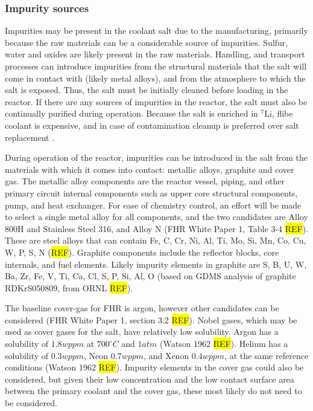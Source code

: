 \documentclass[11pt]{article}
\newcommand{\iso}[2]{$^{#2}\mathrm{#1}$}
\newcommand{\REF}[0]{\colorbox{yellow}{REF}}
\begin{document}
\subsubsection{Impurity sources}

Impurities may be present in the coolant salt due to the manufacturing, primarily because the raw materials can be a considerable source of impurities.
Sulfur, water and oxides are likely present in the raw materials.
Handling, and transport processes can introduce impurities from the structural materials that the salt will come in contact with (likely metal alloys), and from the atmosphere to which the salt is exposed.
Thus, the salt must be initially cleaned before loading in the reactor.
If there are any sources of impurities in the reactor, the salt must also be continually purified during operation.
Because the salt is enriched in \iso{Li}{7}, flibe coolant is expensive, and in case of contamination cleanup is preferred over salt replacement \cite{shaffer1971phs}.

During operation of the reactor, impurities can be introduced in the salt from the materials with which it comes into contact: metallic alloys, graphite and cover gas.
The metallic alloy components are the reactor vessel, piping, and other primary circuit internal components such as upper core structural components, pump, and heat exchanger.
For ease of chemistry control, an effort will be made to select a single metal alloy for all components, and the two candidates are Alloy 800H and Stainless Steel 316, and Alloy N (FHR White Paper 1, Table 3-4 \REF).
These are steel alloys that can contain Fe, C, Cr, Ni, Al, Ti, Mo, Si, Mn, Co, Cu, W, P, S, N (\REF).
Graphite components include the reflector blocks, core internals, and fuel elements.
Likely impurity elements in graphite are S, B, U, W, Ba, Zr, Fe, V, Ti, Ca, Cl, S, P, Si, Al, O (based on GDMS analysis of graphite RDKrS050809, from ORNL \REF).

The baseline cover-gas for FHR is argon, however other candidates can be considered (FHR White Paper 1, section 3.2 \REF).
Nobel gases, which may be used as cover gases for the salt, have relatively low solubility.
Argon has a solubility of $1.8wppm$ at $700^\circ C$ and $1atm$ (Watson 1962 \REF).
Helium has a solubility of $0.3wppm$, Neon $0.7wppm$, and Xenon $0.4wppm$, at the same reference conditions (Watson 1962 \REF).
Impurity elements in the cover gas could also be considered, but given their low concentration and the low contact surface area between the primary coolant and the cover gas, these most likely do not need to be considered.
\end{document}
